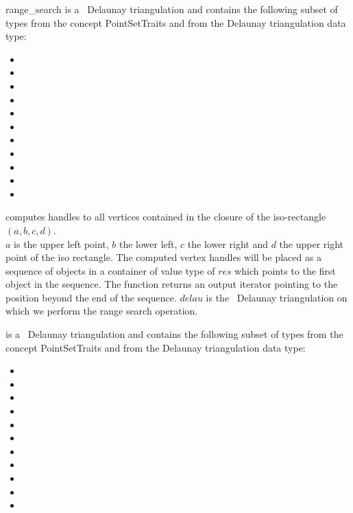 \begin{ccRefFunction}{range_search}
 is a \cgal\ Delaunay triangulation and contains the following subset of types from the concept PointSetTraits and from
the Delaunay triangulation data type:
\begin{itemize}
  \item {} 
  \item {}
  \item {} 
  \item {}   
  \item {} 
  \item {}  
  \item {}  
  \item {} 
  \item {} 
  \item {} 
  \item {}  
\end{itemize}


{computes handles to all vertices contained in the closure of the iso-rectangle $(a,b,c,d)$.\\
\ccPrecond $a$ is the upper left point, $b$ the lower left, $c$ the lower
right and $d$ the upper right point of the iso rectangle.
The computed vertex handles will be placed as a sequence of objects in a container of value type
of $res$
which points to the first object in the sequence. The function
returns an output iterator pointing to the position beyond the end
of the sequence. $delau$ is the \cgal\ Delaunay triangulation on which we perform the range search operation.} 

 is a \cgal\ Delaunay triangulation and contains the following subset of types from the concept PointSetTraits and from
the Delaunay triangulation data type:
\begin{itemize}
  \item {} 
  \item {}
  \item {} 
  \item {}   
  \item {} 
  \item {}  
  \item {}  
  \item {} 
  \item {} 
  \item {} 
  \item {}  
\end{itemize}

\end{ccRefFunction}


